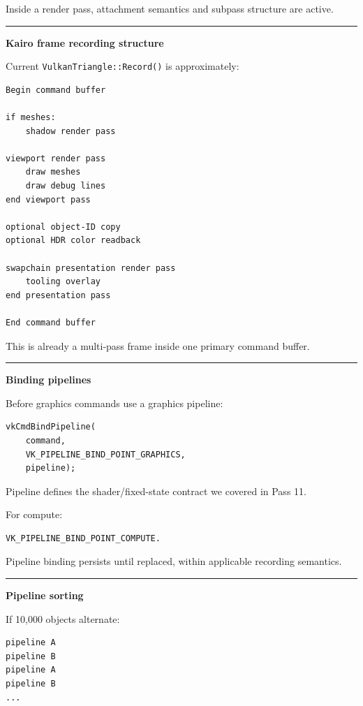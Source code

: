 Inside a render pass, attachment semantics and subpass structure are active.

\begin{center}\rule{0.5\linewidth}{0.5pt}\end{center}

\textbf{Kairo frame recording structure}

Current \texttt{VulkanTriangle::Record()} is approximately:

\begin{verbatim}
Begin command buffer

if meshes:
    shadow render pass

viewport render pass
    draw meshes
    draw debug lines
end viewport pass

optional object-ID copy
optional HDR color readback

swapchain presentation render pass
    tooling overlay
end presentation pass

End command buffer
\end{verbatim}

This is already a multi-pass frame inside one primary command buffer.

\begin{center}\rule{0.5\linewidth}{0.5pt}\end{center}

\textbf{Binding pipelines}

Before graphics commands use a graphics pipeline:

\begin{verbatim}
vkCmdBindPipeline(
    command,
    VK_PIPELINE_BIND_POINT_GRAPHICS,
    pipeline);
\end{verbatim}

Pipeline defines the shader/fixed-state contract we covered in Pass 11.

For compute:

\begin{verbatim}
VK_PIPELINE_BIND_POINT_COMPUTE.
\end{verbatim}

Pipeline binding persists until replaced, within applicable recording semantics.

\begin{center}\rule{0.5\linewidth}{0.5pt}\end{center}

\textbf{Pipeline sorting}

If 10,000 objects alternate:

\begin{verbatim}
pipeline A
pipeline B
pipeline A
pipeline B
...
\end{verbatim}

